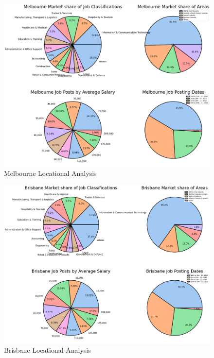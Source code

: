 \documentclass[twoside, 12pt, a4paper]{article}
\begin{document}
\begin{figure}[h!]
	\centering
	\includegraphics[scale = 0.26]{MelbourneLocational.png}
	\caption{Melbourne Locational Analysis}
	\label{fig:MelbLoc}
\end{figure}

\newpage
\begin{figure}[h]
	\centering
	\includegraphics[scale = 0.26]{BrisbaneLocational.png}
	\caption{Brisbane Locational Analysis}
	\label{fig:BrisLoc}
\end{figure}
\end{document}
